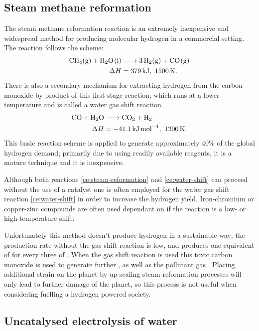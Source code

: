 \subsection{Steam methane reformation}%
\label{sub:steam_methane_reformation}

The steam methane reformation reaction is an extremely inexpensive and widespread method for producing molecular hydrogen in a commercial setting.
The reaction follows the scheme\cite{Saxena2011}:
\begin{align}
	\ce{CH4(g) + H2O(l) &-> 3H2(g) + CO(g)} \label{ce:steam-reformation}\\
	\Delta H &= \SI{379}{\kilo\joule},\ \SI{1500}{K} \nonumber
.\end{align}
There is also a secondary mechanism for extracting hydrogen from the carbon monoxide by-product of this first stage reaction, which runs at a lower temperature and is called a water gas shift reaction\cite{Chen2008,Saxena2011}.
\begin{align}
	\ce{CO + H2O &-> CO2 + H2}\label{ce:water-shift} \\
	\Delta H &= \SI{-41.1}{\kilo\joule\per\mole},\ \SI{1200}{K} \nonumber
.\end{align}
This basic reaction scheme is applied to generate approximately 40\% of the global hydrogen demand\cite{SBN2020}; primarily due to using readily available reagents, it is a mature technique and it is inexpensive.

Although both reactions \eqref{ce:steam-reformation} and \eqref{ce:water-shift} can proceed without the use of a catalyst one is often employed for the water gas shift reaction \eqref{ce:water-shift} in order to increase the hydrogen yield.
Iron-chromium or copper-zinc compounds are often used dependant on if the reaction is a low- or high-temperature shift. 

Unfortunately this method doesn't produce hydrogen in a sustainable way; the production rate without the gas shift reaction is low, and produces one equivalent of  for every three of .
When the gas shift reaction is used this toxic carbon monoxide is used to generate further , as well as the pollutant gas .
Placing additional strain on the planet by up scaling steam reformation processes will only lead to further damage of the planet, so this process is not useful when considering fuelling a hydrogen powered society.


\subsection{Uncatalysed electrolysis of water}%
\label{sub:uncatalysed_electrolysis_of_water}

